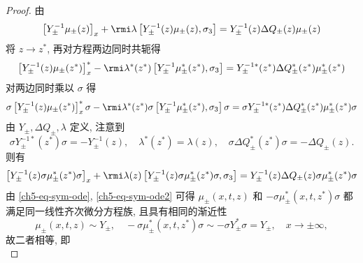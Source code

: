 \begin{proof}
    由
    \begin{equation}
        \left[ Y_{\pm}^{-1} \mu_{\pm}(z) \right]_{x} + \rmi \lambda \left[ Y_{\pm}^{-1}(z) \mu_{\pm}(z), \sigma_{3} \right] = Y_{\pm}^{-1}(z) \Delta{Q_{\pm}(z)} \mu_{\pm}(z)
        \label{ch5-eq-sym-ode}
    \end{equation}
    将 $ z \to z^{*} $, 再对方程两边同时共轭得
    \begin{equation}
        \left[Y_{\pm}^{-1}(z) \mu_{\pm}(z^{*}) \right]_{x}^{*} - \rmi \lambda^{*}(z^{*}) \left[ Y_{\pm}^{-1} \mu_{\pm}^{*}(z^{*}), \sigma_{3} \right] = Y_{\pm}^{-1*}(z^{*}) \Delta{Q_{\pm}^{*}(z^{*})} \mu_{\pm}^{*}(z^{*})
        \label{ch5-eq-sym-conj}
    \end{equation}
    对两边同时乘以 $ \sigma $ 得
    \begin{equation}
        \sigma \left[Y_{\pm}^{-1}(z) \mu_{\pm}(z^{*}) \right]_{x}^{*} \sigma - \rmi \lambda^{*}(z^{*}) \sigma \left[ Y_{\pm}^{-1} \mu_{\pm}^{*}(z^{*}), \sigma_{3} \right] \sigma = \sigma Y_{\pm}^{-1*}(z^{*}) \Delta{Q_{\pm}^{*}(z^{*})} \mu_{\pm}^{*}(z^{*}) \sigma
        \label{ch5-eq-sym-sigma}
    \end{equation}
    由 $ Y_{\pm}, \Delta{Q_{\pm}}, \lambda $ 定义, 注意到
    \begin{equation}
        \sigma Y_{\pm}^{-1*}(z^{*}) \sigma = - Y_{\pm}^{-1}(z), \quad \lambda^{*}(z^{*}) = \lambda(z), \quad \sigma \Delta Q_{\pm}^{*}(z^{*}) \sigma = - \Delta Q_{\pm}(z).
        \label{ch5-eq-sym-id}
    \end{equation}
    则有
    \begin{equation}
        \left[ Y_{\pm}^{-1}(z) \sigma \mu_{\pm}^{*}(z^{*}) \sigma \right]_{x} + \rmi \lambda(z) \left[  Y_{\pm}^{-1}(z) \sigma \mu_{\pm}^{*}(z^{*}) \sigma, \sigma_{3} \right] = Y_{\pm}^{-1}(z) \Delta{Q_{\pm}(z)} \sigma \mu_{\pm}^{*}(z^{*}) \sigma
        \label{ch5-eq-sym-ode2}
    \end{equation}
    由 \eqref{ch5-eq-sym-ode}, \eqref{ch5-eq-sym-ode2} 可得 $ \mu_{\pm}(x,t,z) $ 和 $ -\sigma \mu_{\pm}^{*}(x,t,z^{*}) \sigma $ 都满足同一线性齐次微分方程族, 且具有相同的渐近性
    \begin{equation}
        \mu_{\pm}(x,t,z) \sim Y_{\pm}, \quad -\sigma \mu_{\pm}^{*}(x,t,z^{*}) \sigma \sim -\sigma Y_{\pm}^{*} \sigma = Y_{\pm}, \quad x \to \pm \infty,
        \label{ch5-eq-sym-asymp}
    \end{equation}
    故二者相等, 即
    \begin{equation}

\end{equation}
\end{proof}
